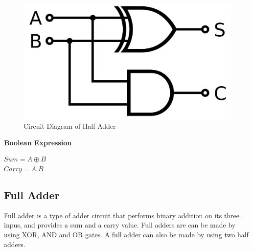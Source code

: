\documentclass[a4paper, 12pt]{article}
\begin{document}
\begin{figure}[h]
	\centering
	\includegraphics[scale=0.1]{half-adder-circuit.png}
	\caption{Circuit Diagram of Half Adder}
\end{figure}

\textbf{Boolean Expression}
\begin{center}
$	Sum = A \oplus B $ \\
$Carry = A . B $ \\
\end{center}
\pagebreak

\subsection{Full Adder}

Full adder is a type of adder circuit that performs 
binary addition on
its three inpus, and provides a sum and a carry value. 
Full adders are can be made by using XOR, AND and OR gates. 
A full adder can also be made by using two half adders. \\
\end{document}

